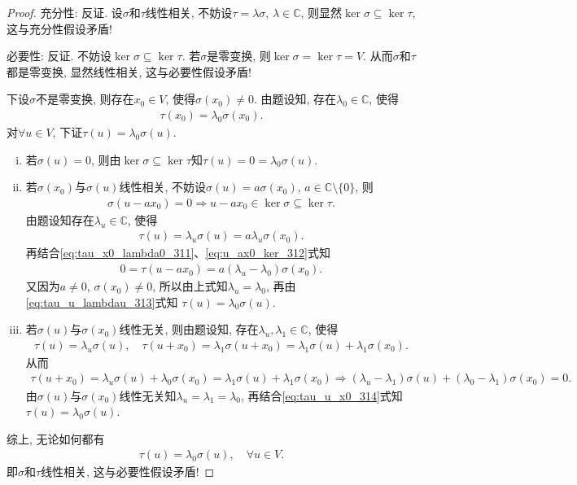 \documentclass[../../main.tex]{subfiles}%
\begin{document}
\begin{proof}

{\heiti 充分性:} 反证. 设$\sigma$和$\tau$线性相关, 不妨设$\tau = \lambda \sigma$, $\lambda \in \mathbb{C}$, 则显然$\ker\sigma \subseteq \ker\tau$, 这与充分性假设矛盾!

{\heiti 必要性:} 反证. 不妨设$\ker\sigma \subseteq \ker\tau$. 若$\sigma$是零变换, 则$\ker\sigma = \ker\tau = V$. 从而$\sigma$和$\tau$都是零变换, 显然线性相关, 这与必要性假设矛盾!

下设$\sigma$不是零变换, 则存在$x_0\in V$, 使得$\sigma(x_0) \ne 0$. 由题设知, 存在$\lambda_0\in \mathbb{C}$, 使得
\begin{align}
\tau(x_0) = \lambda_0 \sigma(x_0).
\label{eq:tau_x0_lambda0_311}
\end{align}
对$\forall u\in V$, 下证$\tau(u) = \lambda_0 \sigma(u)$.
\begin{enumerate}[(i)]
\item 若$\sigma(u) = 0$, 则由$\ker\sigma \subseteq \ker\tau$知$\tau(u) = 0 = \lambda_0 \sigma(u)$.
\item 若$\sigma(x_0)$与$\sigma(u)$线性相关, 不妨设$\sigma(u) = a\sigma(x_0)$, $a\in \mathbb{C} \setminus \{0\}$, 则
\begin{align}
\sigma(u - a x_0) = 0 \Longrightarrow u - a x_0 \in \ker\sigma \subseteq \ker\tau.
\label{eq:u_ax0_ker_312}
\end{align}
由题设知存在$\lambda_u\in \mathbb{C}$, 使得
\begin{align}
\tau(u) = \lambda_u \sigma(u) = a \lambda_u \sigma(x_0).
\label{eq:tau_u_lambdau_313}
\end{align}
再结合\eqref{eq:tau_x0_lambda0_311}、\eqref{eq:u_ax0_ker_312}式知
\begin{align*}
0 = \tau(u - a x_0) = a(\lambda_u - \lambda_0)\sigma(x_0).
\end{align*}
又因为$a\ne 0$, $\sigma(x_0) \ne 0$, 所以由上式知$\lambda_u = \lambda_0$, 再由\eqref{eq:tau_u_lambdau_313}式知
$\tau(u) = \lambda_0 \sigma(u)$.
\item 若$\sigma(u)$与$\sigma(x_0)$线性无关, 则由题设知, 存在$\lambda_u, \lambda_1\in \mathbb{C}$, 使得
\begin{align}
\tau(u) = \lambda_u \sigma(u), \quad \tau(u + x_0) = \lambda_1 \sigma(u + x_0) = \lambda_1 \sigma(u) + \lambda_1 \sigma(x_0).
\label{eq:tau_u_x0_314}
\end{align}
从而
\begin{align*}
\tau(u + x_0) = \lambda_u \sigma(u) + \lambda_0 \sigma(x_0) = \lambda_1 \sigma(u) + \lambda_1 \sigma(x_0)
\Longrightarrow (\lambda_u - \lambda_1)\sigma(u) + (\lambda_0 - \lambda_1)\sigma(x_0) = 0.
\end{align*}
由$\sigma(u)$与$\sigma(x_0)$线性无关知$\lambda_u = \lambda_1 = \lambda_0$, 再结合\eqref{eq:tau_u_x0_314}式知
$\tau(u) = \lambda_0 \sigma(u)$.
\end{enumerate}

综上, 无论如何都有
\begin{align*}
\tau(u) = \lambda_0 \sigma(u), \quad \forall u\in V.
\end{align*}
即$\sigma$和$\tau$线性相关, 这与必要性假设矛盾!
\end{proof}
\end{document}
